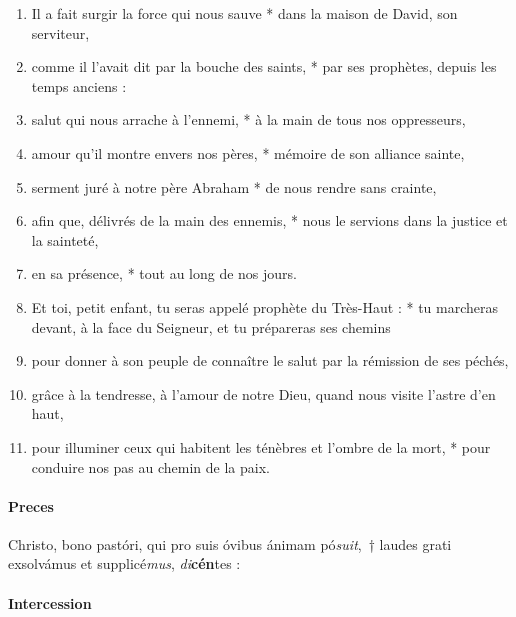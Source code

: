 \documentclass[twoside]{article}
\begin{document}
\begin{paracol}[1]{2}
\begin{enumerate}[wide, itemsep=0mm, labelwidth=!, labelindent=0pt, label=\color{gregoriocolor}\theenumi]
\item Il a fait surgir la force qui nous sauve *
dans la maison de David, son serviteur,

\item comme il l'avait dit par la bouche des saints, *
par ses prophètes, depuis les temps anciens :

\item salut qui nous arrache à l'ennemi, *
à la main de tous nos oppresseurs,

\item amour qu'il montre envers nos pères, *
mémoire de son alliance sainte,

\item serment juré à notre père Abraham *
   de nous rendre sans crainte,

\item afin que, délivrés de la main des ennemis, *
 nous le servions dans la justice et la sainteté,
 
\item en sa présence, * tout au long de nos jours.

\item Et toi, petit enfant, tu seras appelé
   prophète du Très-Haut : *
tu marcheras devant, à la face du Seigneur,
   et tu prépareras ses chemins

\item pour donner à son peuple de connaître le salut
par la rémission de ses péchés,

\item grâce à la tendresse, à l'amour de notre Dieu,
quand nous visite l'astre d'en haut,

\item pour illuminer ceux qui habitent les ténèbres
   et l'ombre de la mort, *
pour conduire nos pas
   au chemin de la paix.
\end{enumerate}

\newpage

\switchcolumn*

\paragraph{Preces}
Christo, bono pastóri, qui pro suis óvibus ánimam pó\textit{suit},~† laudes grati exsolvámus et supplicé\textit{mus}, \textit{di}\textbf{cén}tes :

\switchcolumn

\paragraph{Intercession}


\end{paracol}
\end{document}
